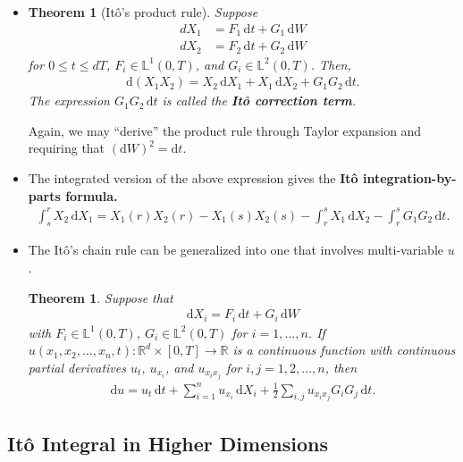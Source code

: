 \documentclass[10pt]{article}
\newtheorem{theorem}[lemma]{Theorem}
\newcommand{\dee}{\mathrm{d}}
\newcommand{\Real}{\mathbb{R}}
\begin{document}
\begin{itemize}
  \item \begin{theorem}[It\^{o}'s product rule]
    Suppose 
    \begin{align*}    
      dX_1 &= F_1\, \dee t + G_1\, \dee W \\
      dX_2 &= F_2\, \dee t + G_2\, \dee W
    \end{align*}
    for $0 \leq t \leq dT$, $F_i \in \mathbb{L}^1(0,T)$, and $G_i \in \mathbb{L}^2(0,T)$. Then,
    \begin{align*}
      \dee(X_1 X_2) = X_2\, \dee X_1 + X_1\, \dee X_2 + G_1G_2\, \dee t.
    \end{align*}
    The expression $G_1 G_2\, \dee t$ is called the {\bf It\^{o} correction term}.
  \end{theorem}
  Again, we may ``derive'' the product rule through Taylor expansion and requiring that $(\dee W)^2 = \dee t$.

  \item The integrated version of the above expression gives the {\bf It\^{o} integration-by-parts formula.}
  \begin{align*}
    \int_s^r X_2\, \dee X_1 = X_1(r)X_2(r) - X_1(s)X_2(s) - \int_r^s X_1\, \dee X_2 - \int_r^s G_1 G_2\, \dee t.
  \end{align*}

  \item The It\^{o}'s chain rule can be generalized into one that involves multi-variable $u$.
  
  \begin{theorem}
    Suppose that
    \begin{align*}
      \dee X_i = F_i\, \dee t + G_i\, \dee W
    \end{align*}
    with $F_i \in \mathbb{L}^1(0,T)$, $G_i \in \mathbb{L}^2(0,T)$ for $i = 1, \dotsc, n$. If $u(x_1, x_2, \dotsc, x_n, t): \Real^d \times [0,T] \rightarrow \Real$ is a continuous function with continuous partial derivatives $u_t$, $u_{x_i}$, and $u_{x_i x_j}$ for $i,j = 1, 2, \dotsc, n$, then
    \begin{align*}
      \dee u = u_t\, \dee t + \sum_{i=1}^n u_{x_i}\, \dee X_i + \frac{1}{2}\sum_{i,j} u_{x_i x_j} G_i G_j\, \dee t.
    \end{align*}
  \end{theorem}
\end{itemize}

\subsection{It\^{o} Integral in Higher Dimensions}
\end{document}
